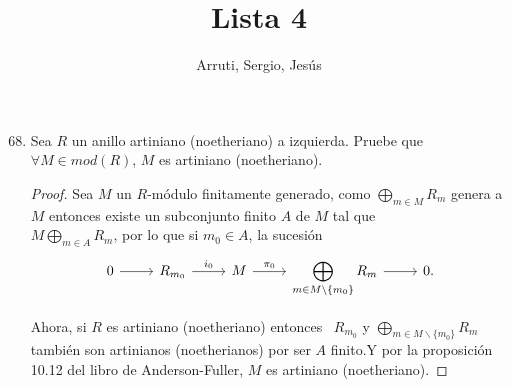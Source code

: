 \documentclass{article}
\title{Lista 4}
\author{Arruti, Sergio, Jesús}
\date{}
\begin{document}
	\maketitle
	\begin{enumerate}[label=\textbf{Ej \arabic*.}]
		\setcounter{enumi}{67}
		\item
		Sea $R$ un anillo artiniano (noetheriano) a izquierda. Pruebe que \\ $\forall M\in mod(R)$, $M$ es artiniano (noetheriano).
		\begin{proof}
			Sea $M$ un $R$-módulo finitamente generado, como $\displaystyle\bigoplus_{m\in M}R_m$ genera a $M$ entonces existe un subconjunto finito 
$A$ de $M$ tal que \\ $M\displaystyle\bigoplus_{m\in A}R_m$, por lo que si $m_0\in A$, la sucesión \[
\begin{tikzcd}
 0   \arrow{r}{}& R_{m_0} \arrow{r}{i_0} & M\arrow{r}{\pi_0} &\arrow{r}{} \displaystyle\bigoplus_{m\in M\backslash \{m_0\}}R_m &0.
\end{tikzcd}
\]

			Ahora, si $R$ es artiniano (noetheriano) entonces \,\,\,$R_{m_0}$ y $ \displaystyle\bigoplus_{m\in M\backslash \{m_0\}}R_m$ \,\,\,también son 
artinianos (noetherianos) por ser $A$ finito.Y por la proposición 10.12 del libro de Anderson-Fuller, $M$ es artiniano (noetheriano).
		\end{proof}
	

\end{enumerate}
\end{document}
